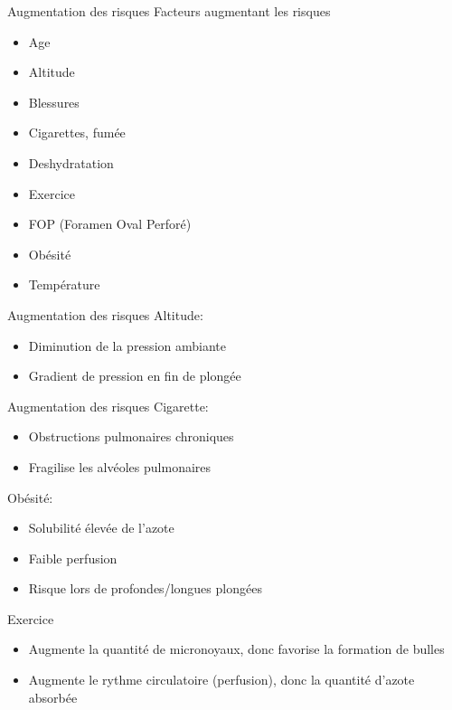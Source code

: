 \begin{frame}{Augmentation des risques}
	Facteurs augmentant les risques
	\begin{itemize}
		\item Age
		\item Altitude
		\item Blessures
		\item Cigarettes, fumée
		\item Deshydratation
		\item Exercice
		\item FOP (Foramen Oval Perforé)
		\item Obésité
		\item Température
	\end{itemize}
\end{frame}

\begin{frame}{Augmentation des risques}  
	Altitude:
	\begin{itemize}
			\item Diminution de la pression ambiante
			\item Gradient de pression en fin de plongée 
		\end{itemize}	
\end{frame}

\begin{frame}{Augmentation des risques}
	Cigarette:
	\begin{itemize}
		\item Obstructions pulmonaires chroniques
		\item Fragilise les alvéoles pulmonaires
	\end{itemize}
	Obésité:
	\begin{itemize}
		\item Solubilité élevée de l'azote
		\item Faible perfusion
		\item Risque lors de profondes/longues plongées
	\end{itemize}
	Exercice
	\begin{itemize}
		\item Augmente la quantité de micronoyaux, donc favorise la formation de bulles
		\item Augmente le rythme circulatoire (perfusion), donc la quantité d'azote absorbée
	\end{itemize}
\end{frame}
